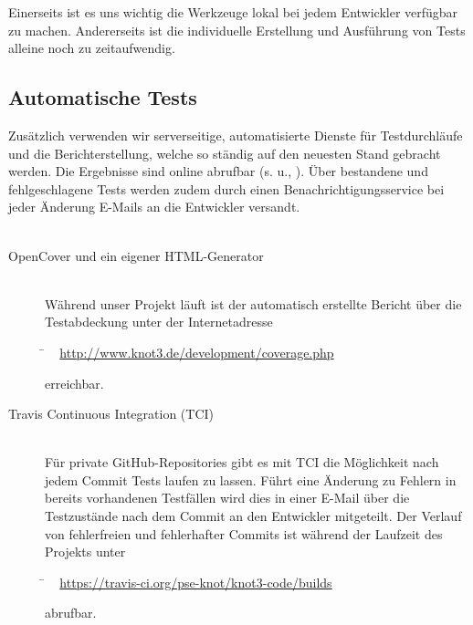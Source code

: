 Einerseits ist es uns wichtig die Werkzeuge lokal bei jedem Entwickler verfügbar zu machen. Andererseits ist die individuelle Erstellung und Ausführung von Tests alleine noch zu zeitaufwendig. 



\subsection{Automatische Tests}
\label{Abschnitt:Programmfehler:Werkzeuge:Automatisiert}

Zusätzlich verwenden wir serverseitige, automatisierte Dienste für Testdurchläufe und die Berichterstellung, welche so ständig auf den neuesten Stand gebracht werden. Die Ergebnisse sind online abrufbar (s. u., ). Über bestandene und fehlgeschlagene Tests werden zudem durch einen Benachrichtigungsservice bei jeder Änderung E-Mails an die Entwickler versandt.
\\
\\


\begin{description}

	\item[OpenCover und ein eigener HTML-Generator] \hfill
	\\
	
	Während unser Projekt läuft ist der automatisch erstellte Bericht über die Testabdeckung unter der Internetadresse
	
	\begin{tabbing}
			\= ~ \href {http://www.knot3.de/development/coverage.php}
					   {http://www.knot3.de/development/coverage.php}
					   
	\end{tabbing} erreichbar.
	\\
	
	\item[Travis Continuous Integration (TCI)] \hfill
	\\
	
	Für private GitHub-Repositories gibt es mit TCI die Möglichkeit nach jedem Commit Tests laufen zu lassen.
	Führt eine Änderung zu Fehlern in bereits vorhandenen Testfällen wird dies in einer E-Mail über die Testzustände nach dem Commit an den Entwickler mitgeteilt. Der Verlauf von fehlerfreien und fehlerhafter Commits ist während der Laufzeit des Projekts unter
	
	\begin{tabbing}
			\= ~ \href {https://travis-ci.org/pse-knot/knot3-code/builds}
		    {https://travis-ci.org/pse-knot/knot3-code/builds}
		   
	\end{tabbing} abrufbar.
	\\
	

\end{description}


